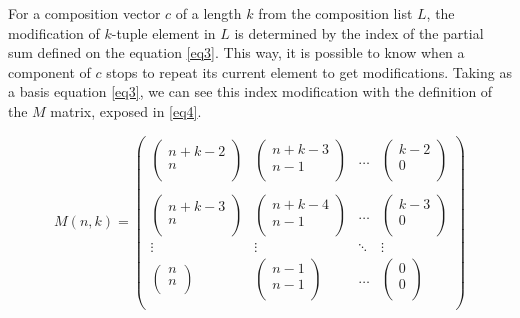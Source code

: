 \documentclass{amsart}
\begin{document}
For a composition vector {$c$} of a length {$k$} from the composition list {$L$}, the modification of {$k$}-tuple element in {$L$} is determined by the index of the partial sum defined on the equation \ref{eq3}. This way, it is possible to know when a component of {$c$} stops to repeat its current element to get modifications. Taking as a basis equation \ref{eq3}, we can see this index modification with the definition of the {$M$} matrix, exposed in \ref{eq4}.

\begin{equation} \label{eq4}
M(n,k) = \left(
\begin{array}{cccc}
\left(\begin{array}{ccc}n + k -2 \\n\\\end{array} \right) &
\left(\begin{array}{ccc}n + k -3 \\n-1\\\end{array} \right) &
\ldots &
\left(\begin{array}{ccc} k - 2 \\0\\\end{array} \right)\\\\
\left(\begin{array}{ccc}n + k -3 \\n\\\end{array} \right) &
\left(\begin{array}{ccc}n + k -4 \\n-1\\\end{array} \right) &
\ldots &
\left(\begin{array}{ccc} k - 3 \\0\\\end{array} \right)\\
\vdots & \vdots & \ddots &\vdots\\
\left(\begin{array}{ccc}n\\n\\\end{array} \right) &
\left(\begin{array}{ccc}n -1\\n-1\\\end{array} \right) & \ldots &
\left(\begin{array}{ccc}0\\0\\\end{array} \right)\\
\end{array} \right)
\end{equation} \\
\end{document}
